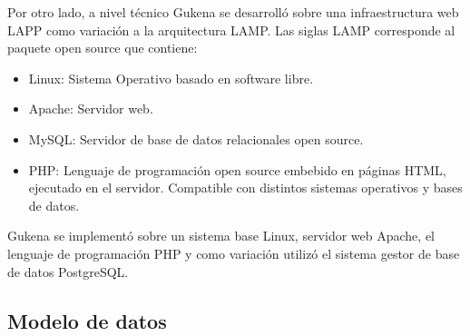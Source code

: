Por otro lado, a nivel técnico Gukena se desarrolló sobre una infraestructura web LAPP como variación a la arquitectura LAMP. Las siglas LAMP corresponde al paquete open source  \cite{chaparro2006lamp} que contiene: 
\begin{itemize}
    \item Linux: Sistema Operativo basado en software libre.
    \item Apache: Servidor web.
    \item MySQL: Servidor de base de datos relacionales open source.
    \item PHP: Lenguaje de programación open source embebido en páginas HTML, ejecutado en el servidor. Compatible con distintos sistemas operativos y bases de datos.
\end{itemize} Gukena se implementó sobre un sistema base Linux, servidor web Apache, el lenguaje de programación PHP y como variación utilizó el sistema gestor de base de datos PostgreSQL. 


\subsection{Modelo de datos}

